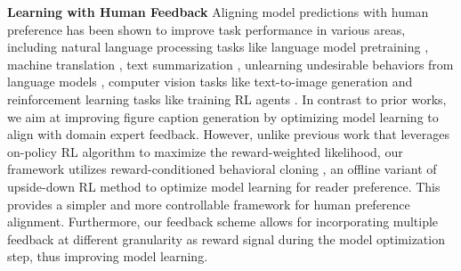 \documentclass[11pt]{article}
\renewcommand{\cite}[1]{\citep{#1}}
\begin{document}
\textbf{Learning with Human Feedback} Aligning model predictions with human preference has been shown to improve task performance in various areas, including natural language processing tasks like language model pretraining \cite{korbak2023pretraining}, machine translation \cite{bahdanau2016actor, kreutzer2018can}, text summarization \cite{stiennon2020learning}, unlearning undesirable behaviors from language models \cite{lu2022quark}, computer vision tasks like text-to-image generation \cite{lee2023aligning, zhang2023hive} and reinforcement learning tasks like training RL agents \cite{macglashan2017interactive, ibarz2018reward, lee2021pebble}. In contrast to prior works, we aim at improving figure caption generation by optimizing model learning to align with domain expert feedback. However, unlike previous work that leverages on-policy RL \cite{schulman2017proximal} algorithm to maximize the reward-weighted likelihood, our framework utilizes reward-conditioned behavioral cloning \cite{emmons2021rvs}, an offline variant of upside-down RL method \cite{srivastava2019training} to optimize model learning for reader preference. This provides a simpler and more controllable framework for human preference alignment. Furthermore, our feedback scheme allows for incorporating multiple feedback at different granularity as reward signal during the model optimization step, thus improving model learning. 



\end{document}
